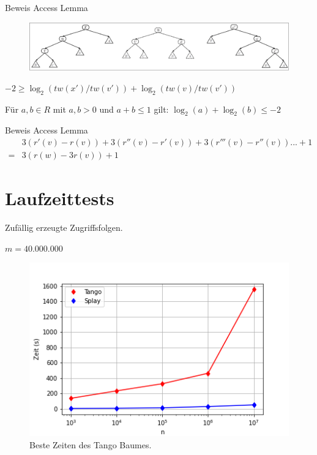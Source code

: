\documentclass[11pt]{beamer}
\begin{document}
\begin{frame}{Beweis Access Lemma}
	\begin{figure}[H]
		\centering
		\includegraphics[width=1\textwidth]{"Medien/pres/zigZigKlein"}
		
	\end{figure}
	
	$-2 \geq \log_2\left(\mathit{tw}\left(x'\right) / \mathit{tw}\left(v'\right)\right) +   \log_2\left(\mathit{tw}\left(v\right) / \mathit{tw}\left(v'\right)\right)$\\
	\bigskip
	
	Für $a,b \in \mathit{R}$ mit $a,b > 0$ und $a + b \leq 1$ gilt: $\log_2\left(a\right) + \log_2\left(b\right) \leq -2$
\end{frame}
\begin{frame}{Beweis Access Lemma}
		\begin{align*}
		&	3(r'(v) - r(v) ) + 3(r''(v) - r'(v)) + 3(r'''(v) - r''(v))...  + 1 \\
		= & 3 (r(w) - 3r(v))  + 1 
	\end{align*}
\end{frame}


\section{Laufzeittests}
	\tableofcontents[]   
	\begin{frame}{Zufällig erzeugte Zugriffsfolgen.}
		\begin{center}
				$m = 40.000.000$\\
		\end{center}
		\begin{figure}[H]
			\centering
			\includegraphics[width=1\textwidth]{"Medien/pres/randomAccess1"}
			\caption{Beste Zeiten des Tango Baumes.}
		\end{figure}
	\end{frame}
\end{document}
